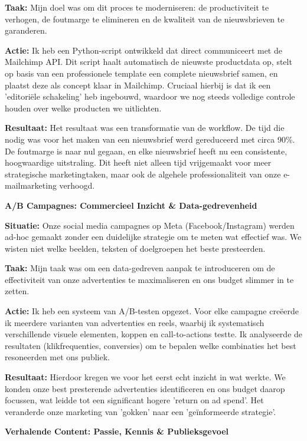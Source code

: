 \documentclass[11pt,a4paper]{article}
\begin{document}
\textbf{Taak:} Mijn doel was om dit proces te moderniseren: de productiviteit te verhogen, de foutmarge te elimineren en de kwaliteit van de nieuwsbrieven te garanderen.

\textbf{Actie:} Ik heb een Python-script ontwikkeld dat direct communiceert met de Mailchimp API. Dit script haalt automatisch de nieuwste productdata op, stelt op basis van een professionele template een complete nieuwsbrief samen, en plaatst deze als concept klaar in Mailchimp. Cruciaal hierbij is dat ik een 'editoriële schakeling' heb ingebouwd, waardoor we nog steeds volledige controle houden over welke producten we uitlichten.

\textbf{Resultaat:} Het resultaat was een transformatie van de workflow. De tijd die nodig was voor het maken van een nieuwsbrief werd gereduceerd met circa 90\%. De foutmarge is naar nul gegaan, en elke nieuwsbrief heeft nu een consistente, hoogwaardige uitstraling. Dit heeft niet alleen tijd vrijgemaakt voor meer strategische marketingtaken, maar ook de algehele professionaliteit van onze e-mailmarketing verhoogd.

\textbf{A/B Campagnes: Commercieel Inzicht \& Data-gedrevenheid}

\textbf{Situatie:} Onze social media campagnes op Meta (Facebook/Instagram) werden ad-hoc gemaakt zonder een duidelijke strategie om te meten wat effectief was. We wisten niet welke beelden, teksten of doelgroepen het beste presteerden.

\textbf{Taak:} Mijn taak was om een data-gedreven aanpak te introduceren om de effectiviteit van onze advertenties te maximaliseren en ons budget slimmer in te zetten.

\textbf{Actie:} Ik heb een systeem van A/B-testen opgezet. Voor elke campagne creëerde ik meerdere varianten van advertenties en reels, waarbij ik systematisch verschillende visuele elementen, koppen en call-to-actions testte. Ik analyseerde de resultaten (klikfrequenties, conversies) om te bepalen welke combinaties het best resoneerden met ons publiek.

\textbf{Resultaat:} Hierdoor kregen we voor het eerst echt inzicht in wat werkte. We konden onze best presterende advertenties identificeren en ons budget daarop focussen, wat leidde tot een significant hogere 'return on ad spend'. Het veranderde onze marketing van 'gokken' naar een 'geïnformeerde strategie'.

\newpage

\textbf{Verhalende Content: Passie, Kennis \& Publieksgevoel}
\end{document}
